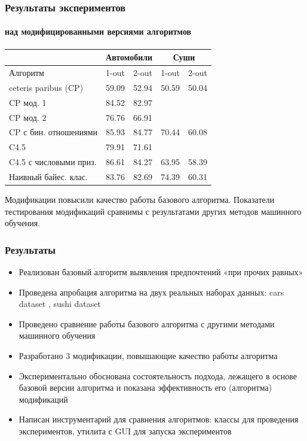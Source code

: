 \documentclass[xcolor=table]{beamer}
\theoremstyle{definition}
\begin{document}
	\begin{frame}
		\frametitle{Результаты экспериментов}
		\framesubtitle{над модифицированными версиями алгоритмов}
		\begin{center}
		\begin{tabular}{|l|ll|ll|}
			\hline
			& \multicolumn{2}{c|}{Автомобили} & \multicolumn{2}{c|}{Суши} \\ \hline
			Алгоритм               & 1-out          & 2-out          & 1-out       & 2-out       \\ \hline
			ceteris paribus (CP)   & 59.09          & 52.94          & 50.59       & 50.04       \\
			\rowcolor[HTML]{CEFFCE} 
			CP мод. 1              & 84.52          & 82.97          &             &             \\
			\rowcolor[HTML]{CEFFCE} 
			CP мод. 2              & 76.76          & 66.91          &             &             \\
			\rowcolor[HTML]{CEFFCE} 
			CP с бин. отношениями  & 85.93          & 84.77          & 70.44       & 60.08       \\
			C4.5                   & 79.91          & 71.61          &             &             \\
			\rowcolor[HTML]{CEFFCE} 
			C4.5 с числовыми приз. & 86.61          & 84.27          & 63.95       & 58.39       \\
			Наивный байес. клас.   & 83.76          & 82.69          & 74.39       & 60.31       \\ \hline
		\end{tabular}
		\end{center}
		
		Модификации повысили качество работы базового алгоритма. Показатели тестирования модификаций сравнимы с результатами других методов машинного обучения.
	\end{frame}
	
	\begin{frame}
		\frametitle{Результаты}
		\begin{itemize}
			\item Реализован базовый алгоритм выявления предпочтений «при прочих равных»
			\item Проведена апробация алгоритма на двух реальных наборах данных: cars dataset \cite{dataset:Abbasnejad:2013}, sushi dataset \cite{Kamishima:2003} 
			\item Проведено сравнение работы базового алгоритма с другими методами машинного обучения
			\item Разработано 3 модификации, повышающие качество работы алгоритма
			\item Экспериментально обоснована состоятельность подхода, лежащего в основе базовой версии алгоритма и показана  эффективность его (алгоритма) модификаций
		\end{itemize}
		\pause
		\begin{itemize}
			\item {\color{gray} Написан инструментарий для сравнения алгоритмов: классы для проведения экспериментов, утилита с GUI для запуска экспериментов}
		\end{itemize}
	\end{frame}
		
\end{document}
